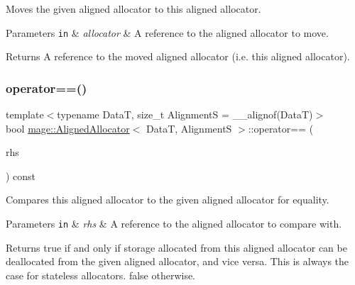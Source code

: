 Moves the given aligned allocator to this aligned allocator.


\begin{DoxyParams}[1]{Parameters}
\mbox{\tt in}  & {\em allocator} & A reference to the aligned allocator to move. \\
\hline
\end{DoxyParams}
\begin{DoxyReturn}{Returns}
A reference to the moved aligned allocator (i.\+e. this aligned allocator). 
\end{DoxyReturn}
\hypertarget{structmage_1_1_aligned_allocator_a3577dfd220aaf85e07ecd1770101a087}{}\label{structmage_1_1_aligned_allocator_a3577dfd220aaf85e07ecd1770101a087} 
\subsubsection{\texorpdfstring{operator==()}{operator==()}}
{\footnotesize\ttfamily template$<$typename DataT, size\+\_\+t AlignmentS = \+\_\+\+\_\+alignof(\+Data\+T)$>$ \\
bool \hyperlink{structmage_1_1_aligned_allocator}{mage\+::\+Aligned\+Allocator}$<$ DataT, AlignmentS $>$\+::operator== (\begin{DoxyParamCaption}\item[{const \hyperlink{structmage_1_1_aligned_allocator}{Aligned\+Allocator}$<$ DataT, AlignmentS $>$ \&}]{rhs }\end{DoxyParamCaption}) const\hspace{0.3cm}{\ttfamily [noexcept]}}

Compares this aligned allocator to the given aligned allocator for equality.


\begin{DoxyParams}[1]{Parameters}
\mbox{\tt in}  & {\em rhs} & A reference to the aligned allocator to compare with. \\
\hline
\end{DoxyParams}
\begin{DoxyReturn}{Returns}
{\ttfamily true} if and only if storage allocated from this aligned allocator can be deallocated from the given aligned allocator, and vice versa. This is always the case for stateless allocators. {\ttfamily false} otherwise. 
\end{DoxyReturn}
